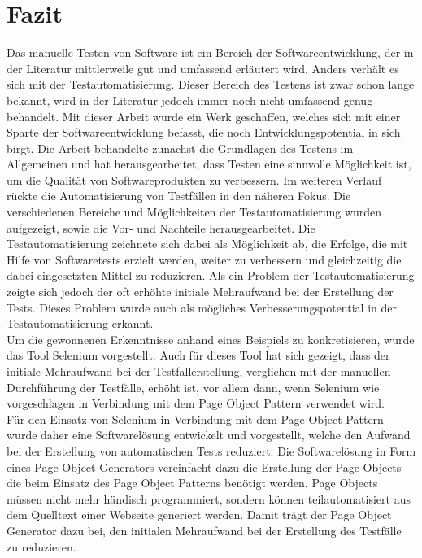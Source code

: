 \chapter{Fazit}
\label{sec:fazit}
Das manuelle Testen von Software ist ein Bereich der Softwareentwicklung, der in der Literatur mittlerweile gut und umfassend erläutert wird. Anders verhält es sich mit der Testautomatisierung. Dieser Bereich des Testens ist zwar schon lange bekannt, wird in der Literatur jedoch immer noch nicht umfassend genug behandelt. Mit dieser Arbeit wurde ein Werk geschaffen, welches sich mit einer Sparte der Softwareentwicklung befasst, die noch Entwicklungspotential in sich birgt. 
Die Arbeit behandelte zunächst die Grundlagen des Testens im Allgemeinen und hat herausgearbeitet, dass Testen eine sinnvolle Möglichkeit ist, um die Qualität von Softwareprodukten zu verbessern. 
Im weiteren Verlauf rückte die Automatisierung von Testfällen in den näheren Fokus. Die verschiedenen Bereiche und Möglichkeiten der Testautomatisierung wurden aufgezeigt, sowie die Vor- und Nachteile herausgearbeitet.
Die Testautomatisierung zeichnete sich dabei als Möglichkeit ab, die Erfolge, die mit Hilfe von Softwaretests erzielt werden, weiter zu verbessern und gleichzeitig die dabei eingesetzten Mittel zu reduzieren. Als ein Problem der Testautomatisierung zeigte sich jedoch der oft erhöhte initiale Mehraufwand bei der Erstellung der Tests. Dieses Problem wurde auch als mögliches Verbesserungspotential in der Testautomatisierung erkannt.\\
Um die gewonnenen Erkenntnisse anhand eines Beispiels zu konkretisieren, wurde das Tool Selenium vorgestellt.
Auch für dieses Tool hat sich gezeigt, dass der initiale Mehraufwand bei der Testfallerstellung, verglichen mit der manuellen Durchführung der Testfälle, erhöht ist, vor allem dann, wenn Selenium wie vorgeschlagen in Verbindung mit dem Page Object Pattern verwendet wird.\\
Für den Einsatz von Selenium in Verbindung mit dem Page Object Pattern wurde daher eine Softwarelösung entwickelt und vorgestellt, welche den Aufwand bei der Erstellung von automatischen Tests reduziert.
Die Softwarelösung in Form eines Page Object Generators vereinfacht dazu die Erstellung der Page Objects die beim Einsatz des Page Object Patterns benötigt werden. Page Objects müssen nicht mehr händisch programmiert, sondern können teilautomatisiert aus dem Quelltext einer Webseite generiert werden. Damit trägt der Page Object Generator dazu bei, den initialen Mehraufwand bei der Erstellung des Testfälle zu reduzieren.


